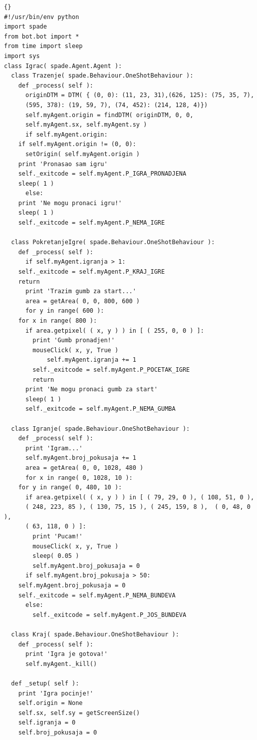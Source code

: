 \documentclass[a4paper,12pt]{foi}
\begin{document}
\begin{lstlisting}[frame=tb]{}
#!/usr/bin/env python
import spade
from bot.bot import *
from time import sleep
import sys 
class Igrac( spade.Agent.Agent ):
  class Trazenje( spade.Behaviour.OneShotBehaviour ):
    def _process( self ):
      originDTM = DTM( { (0, 0): (11, 23, 31),(626, 125): (75, 35, 7),
      (595, 378): (19, 59, 7), (74, 452): (214, 128, 4)}) 
      self.myAgent.origin = findDTM( originDTM, 0, 0,
      self.myAgent.sx, self.myAgent.sy )
      if self.myAgent.origin:
	if self.myAgent.origin != (0, 0):
	  setOrigin( self.myAgent.origin )
	print 'Pronasao sam igru'
	self._exitcode = self.myAgent.P_IGRA_PRONADJENA
	sleep( 1 )
      else:
	print 'Ne mogu pronaci igru!'
	sleep( 1 )
	self._exitcode = self.myAgent.P_NEMA_IGRE
    
  class PokretanjeIgre( spade.Behaviour.OneShotBehaviour ):
    def _process( self ):
      if self.myAgent.igranja > 1:
	self._exitcode = self.myAgent.P_KRAJ_IGRE
	return
      print 'Trazim gumb za start...'
      area = getArea( 0, 0, 800, 600 )
      for y in range( 600 ):
	for x in range( 800 ):
	  if area.getpixel( ( x, y ) ) in [ ( 255, 0, 0 ) ]:
	    print 'Gumb pronadjen!'
	    mouseClick( x, y, True )
            self.myAgent.igranja += 1 
	    self._exitcode = self.myAgent.P_POCETAK_IGRE
	    return
      print 'Ne mogu pronaci gumb za start'
      sleep( 1 )
      self._exitcode = self.myAgent.P_NEMA_GUMBA
      
  class Igranje( spade.Behaviour.OneShotBehaviour ):
    def _process( self ):
      print 'Igram...'
      self.myAgent.broj_pokusaja += 1
      area = getArea( 0, 0, 1028, 480 )
      for x in range( 0, 1028, 10 ):
	for y in range( 0, 480, 10 ):
	  if area.getpixel( ( x, y ) ) in [ ( 79, 29, 0 ), ( 108, 51, 0 ),
	  ( 248, 223, 85 ), ( 130, 75, 15 ), ( 245, 159, 8 ),  ( 0, 48, 0 ),
	  ( 63, 118, 0 ) ]: 
	    print 'Pucam!'
	    mouseClick( x, y, True )
	    sleep( 0.05 )
	    self.myAgent.broj_pokusaja = 0
      if self.myAgent.broj_pokusaja > 50:
	self.myAgent.broj_pokusaja = 0
	self._exitcode = self.myAgent.P_NEMA_BUNDEVA
      else:
        self._exitcode = self.myAgent.P_JOS_BUNDEVA
  
  class Kraj( spade.Behaviour.OneShotBehaviour ):
    def _process( self ):
      print 'Igra je gotova!'
      self.myAgent._kill()
  
  def _setup( self ):
    print 'Igra pocinje!'
    self.origin = None
    self.sx, self.sy = getScreenSize()
    self.igranja = 0
    self.broj_pokusaja = 0
    

\end{lstlisting}
\end{document}

